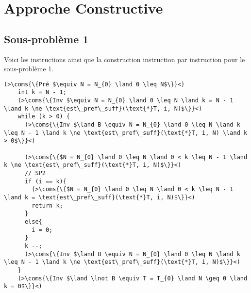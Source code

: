 \section{Approche Constructive}

\subsection{Sous-problème 1}

Voici les instructions ainsi que la construction instruction par instruction pour le sous-problème 1.
\begin{lstlisting}[caption={Sous-problème 1}]
    (>\coms{\{Pré $\equiv N = N_{0} \land 0 \leq N$\}}<)
    int k = N - 1;
    (>\coms{\{Inv $\equiv N = N_{0} \land 0 \leq N \land k = N - 1 \land k \ne \text{est\_pref\_suff}(\text{*}T, i, N)$\}}<)
    while (k > 0) {
      (>\coms{\{Inv $\land B \equiv N = N_{0} \land 0 \leq N \land k \leq N - 1 \land k \ne \text{est\_pref\_suff}(\text{*}T, i, N) \land k > 0$\}}<)

      (>\coms{\{$N = N_{0} \land 0 \leq N \land 0 < k \leq N - 1 \land k \ne \text{est\_pref\_suff}(\text{*}T, i, N)$\}}<)
      // SP2
      if (i == k){
        (>\coms{\{$N = N_{0} \land 0 \leq N \land 0 < k \leq N - 1 \land k = \text{est\_pref\_suff}(\text{*}T, i, N)$\}}<)
        return k;
      }
      else{
        i = 0;
      }
      k --;
      (>\coms{\{Inv $\land B \equiv N = N_{0} \land 0 \leq N \land k \leq N - 1 \land k \ne \text{est\_pref\_suff}(\text{*}T, i, N)$\}}<)
    }
    (>\coms{\{Inv $\land \lnot B \equiv T = T_{0} \land N \geq 0 \land k = 0$\}}<)
\end{lstlisting}


